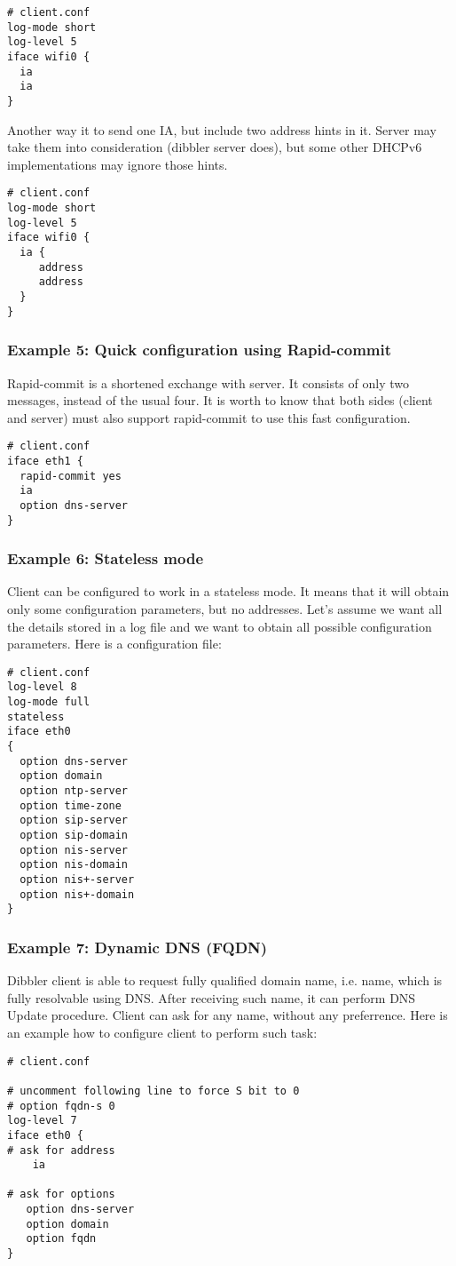 \begin{lstlisting}
# client.conf
log-mode short
log-level 5
iface wifi0 {
  ia
  ia
}
\end{lstlisting}

Another way it to send one IA, but include two address hints in
it. Server may take them into consideration (dibbler server does), but
some other DHCPv6 implementations may ignore those hints.

\begin{lstlisting}
# client.conf
log-mode short
log-level 5
iface wifi0 {
  ia {
     address
     address
  }
}
\end{lstlisting}

\subsubsection{Example 5: Quick configuration using Rapid-commit}
Rapid-commit is a shortened exchange with server. It consists of only
two messages, instead of the usual four. It is worth to know that both sides (client
and server) must also support rapid-commit to use this fast
configuration. 

\begin{lstlisting}
# client.conf
iface eth1 {
  rapid-commit yes
  ia 
  option dns-server
}
\end{lstlisting}

\subsubsection{Example 6: Stateless mode}
Client can be configured to work in a stateless mode. It means that it
will obtain only some configuration parameters, but no
addresses. Let's assume we want all the details stored in a log file and
we want to obtain all possible configuration parameters. Here is a
configuration file:

\begin{lstlisting}
# client.conf
log-level 8
log-mode full
stateless
iface eth0
{
  option dns-server
  option domain
  option ntp-server
  option time-zone
  option sip-server
  option sip-domain
  option nis-server
  option nis-domain
  option nis+-server
  option nis+-domain
}
\end{lstlisting}

\subsubsection{Example 7: Dynamic DNS (FQDN)}
\label{example-client-fqdn}
Dibbler client is able to request fully qualified domain name,
i.e. name, which is fully resolvable using DNS. After receiving such
name, it can perform DNS Update procedure. Client can ask for any
name, without any preferrence. Here is an example how to configure
client to perform such task:
\begin{lstlisting}
# client.conf

# uncomment following line to force S bit to 0
# option fqdn-s 0
log-level 7
iface eth0 {
# ask for address
    ia

# ask for options
   option dns-server
   option domain
   option fqdn
}
\end{lstlisting}

